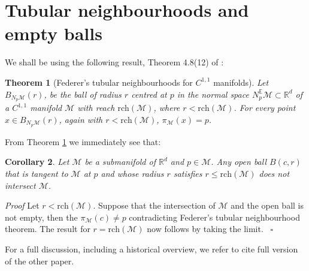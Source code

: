 \documentclass{article}
\newenvironment{proof}[1][{}]{%
  \begin{trivlist}\item[]\textit{Proof #1}\quad}%
  {\hfill\hspace*{\fill}~$\square$\end{trivlist}}
\newtheorem{theorem}{Theorem}[section]
\newtheorem{corollary}[theorem]{Corollary}
\newcommand{\M}{\mathcal{M}}
\newcommand{\rch}{\mathrm{rch}}
\begin{document}
\section{Tubular neighbourhoods and empty balls} 
We shall be using the following result, Theorem 4.8(12) of \cite{federer1959}:
\begin{theorem}[Federer's tubular neighbourhoods for $C^{1,1}$ manifolds] \label{Theorem:TubularNeighbourhood}
Let $B_{N_p\M} (r)$, be the ball of radius $r$ centred at $p$ in the normal space $N_p^{\mathbb{E}}\M\subset \mathbb{R}^d$ of a $C^{1,1}$ manifold $\M$ with reach $\rch ( \M)$, where $r< \rch (\M)$. For every point $x \in B_{N_p\M} (r)$, again with $r< \rch (\M)$, $\pi_{\M}(x)=p$.
\end{theorem}

From Theorem \ref{Theorem:TubularNeighbourhood} we immediately see that: 
\begin{corollary}
\label{lem:medialball}
Let $\M$ be a submanifold of $\mathbb{R}^d$ and $p\in \M$. Any open ball $B(c,r)$ that is tangent to $\M$ at $p$ and whose radius $r$ satisfies $r\leq \rch (\M)$ does not intersect $\M$.
\end{corollary}
\begin{proof} Let $r < \rch (\M)$.
Suppose that the intersection of $\M$ and the open ball is not empty, then the $\pi_{\M}(c)\neq p$ contradicting Federer's tubular neighbourhood theorem. The result for $r=  \rch (\M)$ now follows by taking the limit.
\end{proof}

For a full discussion, including a historical overview, we refer to {\color{red} cite full version of the other paper}. 











\end{document}
